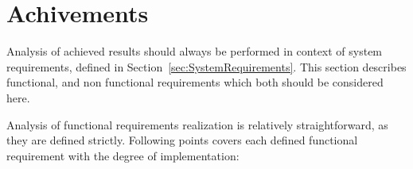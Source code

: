 %


\section{Achivements}
\label{sec:ch8_achivments}

Analysis of achieved results should always be performed in context of system requirements, defined in Section~\ref{sec:SystemRequirements}. This section describes functional, and non functional requirements which both should be considered here. 

Analysis of functional requirements realization is relatively straightforward, as they are defined strictly. 
Following points covers each defined functional requirement with the degree of implementation:

